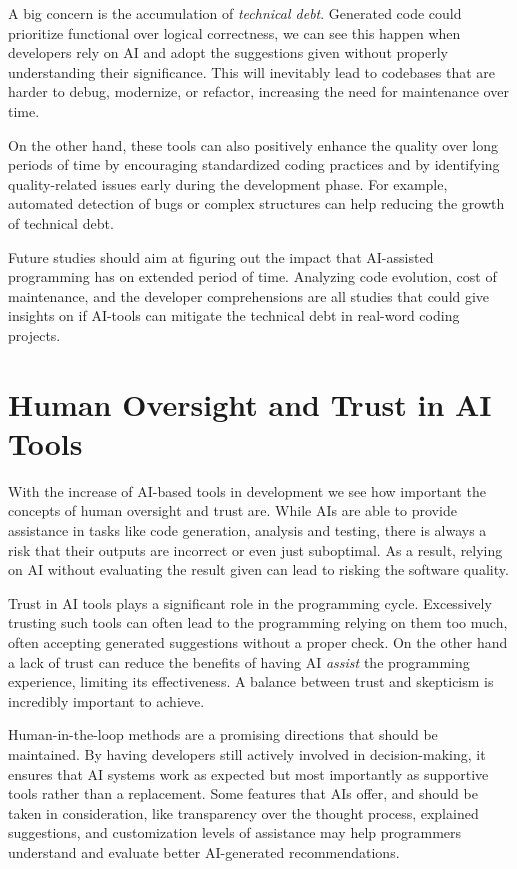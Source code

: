A big concern is the accumulation of \textit{technical debt}. Generated code could prioritize functional over logical correctness, we can see this happen when developers rely on AI and adopt the suggestions given without properly understanding their significance. This will inevitably lead to codebases that are harder to debug, modernize, or refactor, increasing the need for maintenance over time.

On the other hand, these tools can also positively enhance the quality over long periods of time by encouraging standardized coding practices and by identifying quality-related issues early during the development phase. For example, automated detection of bugs or complex structures can help reducing the growth of technical debt.

Future studies should aim at figuring out the impact that AI-assisted programming has on extended period of time. Analyzing code evolution, cost of maintenance, and the developer comprehensions are all studies that could give insights on if AI-tools can mitigate the technical debt in real-word coding projects.

\section{Human Oversight and Trust in AI Tools}

With the increase of AI-based tools in development we see how important the concepts of human oversight and trust are. While AIs are able to provide assistance in tasks like code generation, analysis and testing, there is always a risk that their outputs are incorrect or even just suboptimal. As a result, relying on AI without evaluating the result given can lead to risking the software quality.

Trust in AI tools plays a significant role in the programming cycle. Excessively trusting such tools can often lead to the programming relying on them too much, often accepting generated suggestions without a proper check. On the other hand a lack of trust can reduce the benefits of having AI \textit{assist} the programming experience, limiting its effectiveness. A balance between trust and skepticism is incredibly important to achieve.

Human-in-the-loop methods are a promising directions that should be maintained. By having developers still actively involved in decision-making, it ensures that AI systems work as expected but most importantly as supportive tools rather than a replacement. Some features that AIs offer, and should be taken in consideration, like transparency over the thought process, explained suggestions, and customization levels of assistance may help programmers understand and evaluate better AI-generated recommendations.

